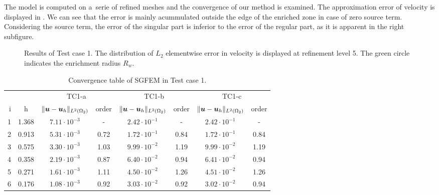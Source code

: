 The model is computed on a~serie of refined meshes and the convergence of our method is examined.
The approximation error of velocity is displayed in . We can see that 
the error is mainly acummulated outside the edge of the enriched zone in case of zero source term.
Considering the source term, the error of the singular part is inferior to the error of the regular part, as it is apparent
in the right subfigure.
%
\begin{figure}[!htb]
    \centering
    \caption[Error distribution in Test case 1.]
    {Results of Test case 1. The distribution of $L_2$ elementwise error in velocity is displayed at refinement level 5.
    The green circle indicates the enrichment radius $R_w$.}
    \label{fig:mh_tc1_error}
\end{figure}
%
%
%
\begin{table}[!htb]
\begin{center}
\bgroup
\def\arraystretch{1.2}
\setlength\tabcolsep{5pt}
\begin{tabular}{rc|cc|cc|cc}
\toprule
\multicolumn{2}{c|}{} & \multicolumn{2}{c|}{ TC1-a} & \multicolumn{2}{c|}{TC1-b} & \multicolumn{2}{c}{TC1-c}\\ [3pt] %
i & h & $\|\mathbf{\boldsymbol{u}}-\mathbf{\boldsymbol{u}}_h\|_{L^2(\Omega_2)}$ & order & $\|\mathbf{\boldsymbol{u}}-\mathbf{\boldsymbol{u}}_h\|_{L^2(\Omega_2)}$
    & order & $\|\mathbf{\boldsymbol{u}}-\mathbf{\boldsymbol{u}}_h\|_{L^2(\Omega_2)}$ & order \\ [3pt] \midrule
1 & 1.368 &  $7.11\cdot10^{-3}$  &  -   &  $2.42\cdot10^{-1}$  &  -   &  $2.42\cdot10^{-1}$ &   -   \\
2 & 0.913 &  $5.31\cdot10^{-3}$  & 0.72 &  $1.72\cdot10^{-1}$  & 0.84 &  $1.72\cdot10^{-1}$ &  0.84 \\
3 & 0.575 &  $3.30\cdot10^{-3}$  & 1.03 &  $9.99\cdot10^{-2}$  & 1.19 &  $9.99\cdot10^{-2}$ &  1.19 \\
4 & 0.358 &  $2.19\cdot10^{-3}$  & 0.87 &  $6.40\cdot10^{-2}$  & 0.94 &  $6.41\cdot10^{-2}$ &  0.94 \\
5 & 0.271 &  $1.61\cdot10^{-3}$  & 1.11 &  $4.50\cdot10^{-2}$  & 1.26 &  $4.51\cdot10^{-2}$ &  1.26 \\
6 & 0.176 &  $1.08\cdot10^{-3}$  & 0.92 &  $3.03\cdot10^{-2}$  & 0.92 &  $3.02\cdot10^{-2}$ &  0.94 \\
\bottomrule
\end{tabular}
\caption{Convergence table of SGFEM in Test case 1.}
\label{tab:mh_tc1_convergence}
\egroup
\end{center}
\end{table}

